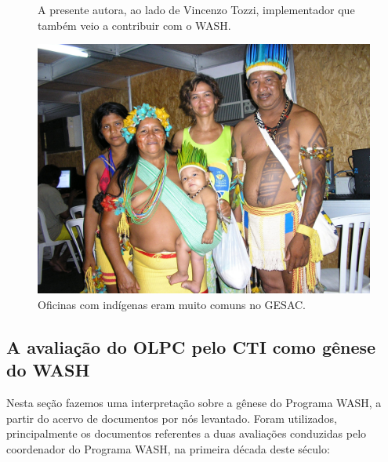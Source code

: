 \documentclass[
12pt,		%
openright,	%
twoside,  %
a4paper,			%
chapter=TITLE,		%
english,			%
french,				%
spanish,			%
brazil				%
]{USPSC-classe/USPSC}
\begin{document}
\begin{figure}[max size={\textwidth}{\textheight}]
\begin{minipage}[b]{0.4\linewidth}
                \caption{A presente autora, ao lado de Vincenzo Tozzi, implementador que tamb\'em veio a contribuir com o WASH.}
                \label{4459669909728990ef00df4bdb6a369f3449704e}
\end{minipage}
\hspace{0.5cm}
\begin{minipage}[b]{0.4\linewidth}
        \centering
                \includegraphics[width=1.0\linewidth]{../../imagens/povo.JPG}
                \caption{Oficinas com ind\'{i}genas eram muito comuns no GESAC.}
                \label{50c13a4f82feece9e41db915d8e5bc4c5d5094dd}
\end{minipage}%
\hspace{0.5cm}
\end{figure}



\subsection[A avalia\c{c}\~ao do OLPC pelo CTI como g\^enese do WASH]{A avalia\c{c}\~ao do OLPC pelo CTI como g\^enese do WASH}\label{A avalia\c{c}\~ao do OLPC pelo CTI como g\^enese do WASH}
Nesta se\c{c}\~ao fazemos uma interpreta\c{c}\~ao sobre a g\^enese do Programa WASH, a partir do acervo de documentos por n\'os levantado. Foram utilizados, principalmente  os documentos referentes a duas avalia\c{c}\~oes conduzidas pelo coordenador do Programa WASH, na primeira d\'ecada deste s\'eculo:
\end{document}
